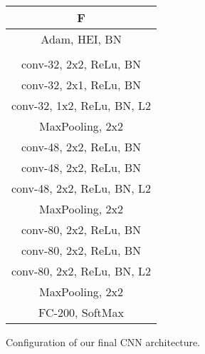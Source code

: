\begin{tabular}{|c|}
  \hline
  \multicolumn{1}{|c|}{F}
  \\\hline
  Adam, HEI, BN
  \\\hhline{|=|}

  \multicolumn{1}{|c|}{input ($64\times64\times3\;RGB\;image$)}
  \\\hline

  conv-32, 2x2, ReLu, BN
  \\
  conv-32, 2x1, ReLu, BN
  \\
  conv-32, 1x2, ReLu, BN, L2
  \\\hline
  MaxPooling, 2x2
  \\\hline
  conv-48, 2x2, ReLu, BN
  \\
  conv-48, 2x2, ReLu, BN
  \\
  conv-48, 2x2, ReLu, BN, L2
  \\\hline
  MaxPooling, 2x2
  \\\hline
  conv-80, 2x2, ReLu, BN
  \\
  conv-80, 2x2, ReLu, BN
  \\
  conv-80, 2x2, ReLu, BN, L2
  \\\hline
  MaxPooling, 2x2
  \\\hline
  FC-200, SoftMax
  \\\hline
  \end{tabular}
\caption[]
{\small
  Configuration of our final CNN architecture.
}
\label{table:final_config}
